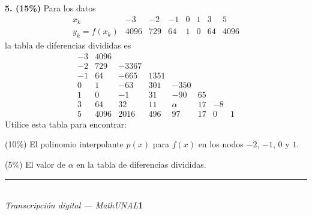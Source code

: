 \documentclass[11pt]{article}
\begin{document}
\vspace{5mm}
\noindent\textbf{5. (15\%)} Para los datos
\[
\begin{array}{c|c|c|c|c|c|c|c}
x_k & -3 & -2 & -1 & 0 & 1 & 3 & 5\\ \hline
y_k=f(x_k) & 4096 & 729 & 64 & 1 & 0 & 64 & 4096
\end{array}
\]
la tabla de diferencias divididas es
\[
\begin{array}{ccccccc}
-3 & 4096 & & & & & \\
-2 & 729 & -3367 & & & & \\
-1 & 64 & -665 & 1351 & & & \\
0 & 1 & -63 & 301 & -350 & & \\
1 & 0 & -1 & 31 & -90 & 65 & \\
3 & 64 & 32 & 11 & \alpha & 17 & -8\\
5 & 4096 & 2016 & 496 & 97 & 17 & 0 & 1
\end{array}
\]
Utilice esta tabla para encontrar:
\begin{romanitos}
\item (10\%) El polinomio interpolante $p(x)$ para $f(x)$ en los nodos $-2$, $-1$, $0$ y $1$.
\item (5\%) El valor de $\alpha$ en la tabla de diferencias divididas.
\end{romanitos}

\vfill
\rule{\linewidth}{0.4pt}\\[1pt]
{\scriptsize\textit{Transcripción digital --- MathUNAL}\hfill\textcolor{unalblue}{\textbf{1}}}
\end{document}
